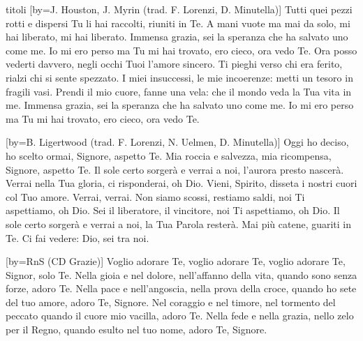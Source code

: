 \begin{songs}{titoli}
[by={J. Houston, J. Myrin (trad. F. Lorenzi, D. Minutella)}]
\beginverse
Tutti quei pezzi
rotti e dispersi
Tu li hai raccolti,
riuniti in Te.
A mani vuote
ma mai da solo,
mi hai liberato,
mi hai liberato.
\endverse
\beginverse*
Immensa grazia,
sei la speranza
che ha salvato uno come me.
Io mi ero perso
ma Tu mi hai trovato,
ero cieco,
ora vedo Te.
\endverse
\beginchorus
Ora posso vederti davvero,
negli occhi Tuoi l'amore sincero.
Ti pieghi verso chi era ferito,
rialzi chi si sente spezzato.
\endchorus
\beginverse
I miei insuccessi,
le mie incoerenze:
metti un tesoro
in fragili vasi.
Prendi il mio cuore,
fanne una vela:
che il mondo veda
la Tua vita in me.
\endverse
\beginverse*
Immensa grazia,
sei la speranza
che ha salvato uno come me.
Io mi ero perso
ma Tu mi hai trovato,
ero cieco,
ora vedo Te.
\endverse
\endsong

[by={B. Ligertwood (trad. F. Lorenzi, N. Uelmen, D. Minutella)}]
\beginverse
Oggi ho deciso, ho scelto ormai,
Signore, aspetto Te.
Mia roccia e salvezza, mia ricompensa,
Signore, aspetto Te.
Il sole certo sorgerà
e verrai a noi,
l'aurora presto nascerà.
\endverse
\beginchorus
Verrai nella Tua gloria,
ci risponderai, oh Dio.
Vieni, Spirito,
disseta i nostri cuori col Tuo amore.
Verrai, verrai.
\endchorus
\beginverse
Non siamo scossi, restiamo saldi,
noi Ti aspettiamo, oh Dio.
Sei il liberatore, il vincitore,
noi Ti aspettiamo, oh Dio.
Il sole certo sorgerà
e verrai a noi,
la Tua Parola resterà.
\endverse
\beginverse*
Mai più catene,
guariti in Te.
Ci fai vedere:
Dio, sei tra noi.
\endverse
\endsong

[by={RnS (CD Grazie)}]
\beginchorus
Voglio adorare Te, voglio adorare Te,
voglio adorare Te, Signor, solo Te. 
\endchorus
\beginverse
Nella gioia e nel dolore, nell'affanno della vita,
quando sono senza forze, adoro Te.
Nella pace e nell'angoscia, nella prova della croce,
quando ho sete del tuo amore, adoro Te, Signore.
\endverse
\beginverse
Nel coraggio e nel timore, nel tormento del peccato
quando il cuore mio vacilla, adoro Te.
Nella fede e nella grazia, nello zelo per il Regno,
quando esulto nel tuo nome, adoro Te, Signore.
\endverse
\endsong

\end{songs}
